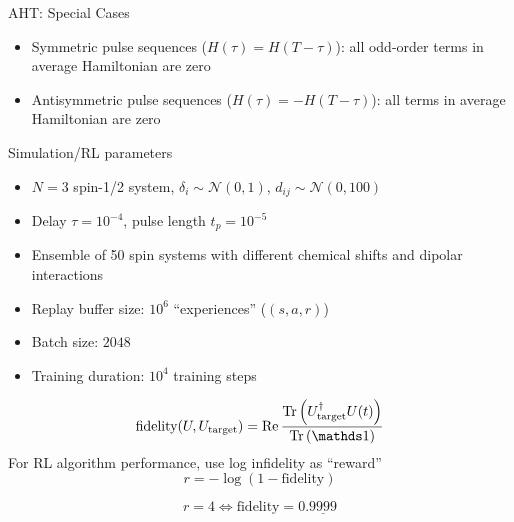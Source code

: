 \documentclass{beamer}
\begin{document}
\begin{frame}{AHT: Special Cases}

\begin{itemize}

\item
  Symmetric pulse sequences (\(H(\tau) = H(T - \tau)\)): all odd-order
  terms in average Hamiltonian are zero
\item
  Antisymmetric pulse sequences (\(H(\tau) = - H(T - \tau)\)): all
  terms in average Hamiltonian are zero
\end{itemize}
\end{frame}

%
%

\begin{frame}{Simulation/RL parameters}

\begin{itemize}
    \item $N=3$ spin-1/2 system, $\delta_i \sim \mathcal{N}(0, 1)$, $d_{ij} \sim \mathcal{N}(0, 100)$
    \item Delay $\tau = 10^{-4}$, pulse length $t_p = 10^{-5}$
    \item Ensemble of 50 spin systems with different chemical shifts and dipolar interactions
\end{itemize}


\begin{itemize}
    \item Replay buffer size: $10^6$ ``experiences'' ($(s, a, r)$)
    \item Batch size: $2048$
    \item Training duration: $10^4$ training steps
\end{itemize}

\[
    \text{fidelity}(U, U_\text{target}) = \Re{
        \frac{\Tr{U_\text{target}^\dagger U(t)}}{\Tr{\identity}}
    }
\]
For RL algorithm performance, use log infidelity as ``reward''
\[
    r = -\log \left( 1 - \text{fidelity} \right)
\]

\[
r = 4 \iff \text{fidelity} = 0.\underline{9999}
\]


\end{frame}
\end{document}
